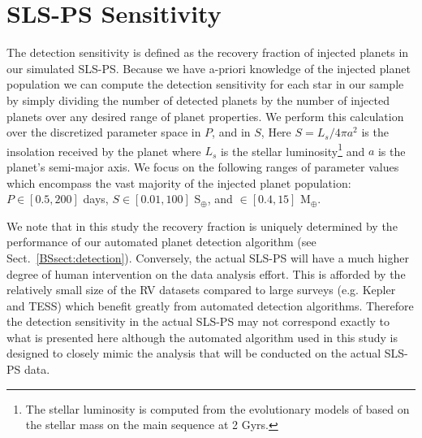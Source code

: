 \section{SLS-PS Sensitivity} \label{BSsect:sensitivity}
The detection sensitivity is defined as the recovery fraction of injected planets in our simulated SLS-PS.
Because we have a-priori knowledge of the injected planet population we can compute the detection sensitivity
for each star in our sample by simply dividing the number of detected planets by the number of injected
planets over any desired range of planet properties. We perform this calculation over the discretized
parameter space in $P$, \msini{} and in $S$, 
Here $S=L_s / 4\pi a^2$ is the insolation received by the planet where $L_s$ is the stellar
luminosity\footnote{The stellar luminosity is computed from the evolutionary models of \cite{baraffe98} 
based on the stellar mass on the main sequence at 2 Gyrs.} and $a$ is the planet's semi-major axis. We 
focus on the
following ranges of parameter values which encompass the vast majority of the injected planet population:
$P \in [0.5,200]$ days, $S \in [0.01,100]$ S$_{\oplus}$, and \msini{} $\in [0.4,15]$ M$_{\oplus}$. 

We note that in this
study the recovery fraction is uniquely determined by the performance of our automated planet detection  
algorithm (see Sect.~\ref{BSsect:detection}). Conversely, the actual SLS-PS will have a much higher degree of
human intervention on the data analysis effort. This is afforded by the relatively small size of the RV
datasets compared to large surveys (e.g. Kepler and TESS)
which benefit greatly from automated detection algorithms. Therefore the detection sensitivity in the actual
SLS-PS may not correspond exactly to what is presented here although the automated algorithm used
in this study is designed to closely mimic the analysis that will be conducted on the actual SLS-PS data.

